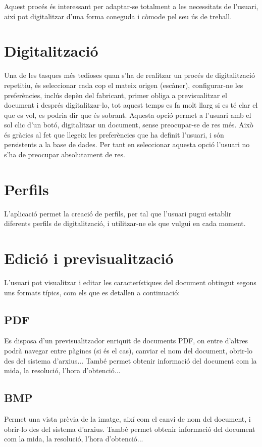 \documentclass[letterpaper,11pt,catalan]{sphinxmanual}
\begin{document}
Aquest procés és interessant per adaptar-se totalment a les necessitats de l'usuari, així pot
digitalitzar d'una forma coneguda i còmode pel seu ús de treball.


\section{Digitalització}
\label{\detokenize{index:digitalitzacio}}
Una de les tasques més tedioses quan s'ha de realitzar un procés de digitalització repetitiu,
és seleccionar cada cop el mateix origen (escàner), configurar-ne les preferències, inclús
depèn del fabricant, primer obliga a previsualitzar el document i després digitalitzar-lo,
tot aquest temps es fa molt llarg si es té clar el que es vol, es podria dir que és sobrant.
Aquesta opció permet a l'usuari amb el sol clic d'un botó, digitalitzar un document, sense
preocupar-se de res més. Això és gràcies al fet que llegeix les preferències que ha definit l'usuari,
i són persistents a la base de dades. Per tant en seleccionar aquesta opció l'usuari no
s'ha de preocupar absolutament de res.


\section{Perfils}
\label{\detokenize{index:perfils}}
L'aplicació permet la creació de perfils, per tal que l'usuari pugui establir diferents
perfils de digitalització, i utilitzar-ne els que vulgui en cada moment.


\section{Edició i previsualització}
\label{\detokenize{index:edicio-i-previsualitzacio}}
L'usuari pot visualitzar i editar les característiques del document obtingut segons
uns formats típics, com els que es detallen a continuació:


\subsection{PDF}
\label{\detokenize{index:pdf}}
Es disposa d'un previsualitzador enriquit de documents PDF, on entre d'altres podrà
navegar entre pàgines (si és el cas), canviar el nom del document, obrir-lo des del
sistema d'arxius... També permet obtenir informació del document
com la mida, la resolució, l'hora d'obtenció...


\subsection{BMP}
\label{\detokenize{index:bmp}}
Permet una vista prèvia de la imatge, així com el canvi de nom del document, i obrir-lo
des del sistema d'arxius. També permet obtenir informació del document
com la mida, la resolució, l'hora d'obtenció...
\end{document}
